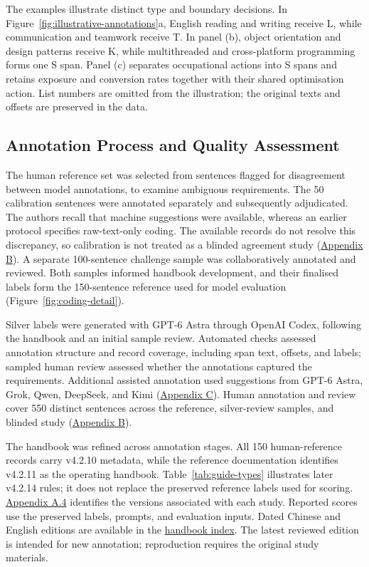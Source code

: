

The examples illustrate distinct type and boundary decisions. In Figure~\ref{fig:illustrative-annotations}a, English reading and writing receive L, while communication and teamwork receive T. In panel (b), object orientation and design patterns receive K, while multithreaded and cross-platform programming forms one S span. Panel (c) separates occupational actions into S spans and retains exposure and conversion rates together with their shared optimisation action. List numbers are omitted from the illustration; the original texts and offsets are preserved in the data.

\subsection{Annotation Process and Quality Assessment}
\label{sec:annotation-workflow-r36}

The human reference set was selected from sentences flagged for disagreement between model annotations, to examine ambiguous requirements. The 50 calibration sentences were annotated separately and subsequently adjudicated. The authors recall that machine suggestions were available, whereas an earlier protocol specifies raw-text-only coding. The available records do not resolve this discrepancy, so calibration is not treated as a blinded agreement study (\hyperref[app:b]{Appendix B}). A separate 100-sentence challenge sample was collaboratively annotated and reviewed. Both samples informed handbook development, and their finalised labels form the 150-sentence reference used for model evaluation (Figure~\ref{fig:coding-detail}).

Silver labels were generated with GPT-6 Astra through OpenAI Codex, following the handbook and an initial sample review. Automated checks assessed annotation structure and record coverage, including span text, offsets, and labels; sampled human review assessed whether the annotations captured the requirements. Additional assisted annotation used suggestions from GPT-6 Astra, Grok, Qwen, DeepSeek, and Kimi (\hyperref[tab:annotation-models]{Appendix C}). Human annotation and review cover 550 distinct sentences across the reference, silver-review samples, and blinded study (\hyperref[sec:human-review-coverage]{Appendix B}).

The handbook was refined across annotation stages. All 150 human-reference records carry v4.2.10 metadata, while the reference documentation identifies v4.2.11 as the operating handbook. Table~\ref{tab:guide-types} illustrates later v4.2.14 rules; it does not replace the preserved reference labels used for scoring. \hyperref[sec:guide-version-history]{Appendix A.4} identifies the versions associated with each study. Reported scores use the preserved labels, prompts, and evaluation inputs. Dated Chinese and English editions are available in the \href{https://github.com/AlfredJamesLi/chinese-skillspan-benchmark/blob/main/notes/handbooks/README.md}{handbook index}. The latest reviewed edition is intended for new annotation; reproduction requires the original study materials.

